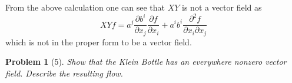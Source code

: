 \documentclass[10pt]{article}
\newcommand{\sk}{\vskip 10mm}
\theoremstyle{plain}
\newtheorem{problem}{Problem}
\theoremstyle{remark}
\begin{document}
From the above calculation one can see that $XY$ is not a vector field as
\[
  XYf = a^j\frac{\partial b^i}{\partial x_j}\frac{\partial f}{\partial x_i}+a^ib^i\frac{\partial^2 f}{\partial x_i\partial x_j}
\]
which is not in the proper form to be a vector field.

\sk

\begin{problem}[5]
  Show that the Klein Bottle has an everywhere nonzero vector field.
  Describe the resulting flow.
\end{problem}

\end{document}
